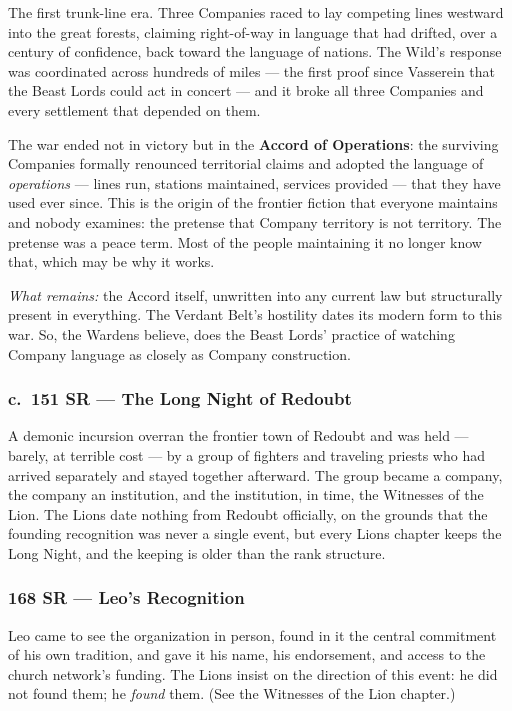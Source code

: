 The first trunk-line era. Three Companies raced to lay competing lines westward into the great forests, claiming right-of-way in language that had drifted, over a century of confidence, back toward the language of nations. The Wild's response was coordinated across hundreds of miles --- the first proof since Vasserein that the Beast Lords could act in concert --- and it broke all three Companies and every settlement that depended on them.

The war ended not in victory but in the \textbf{Accord of Operations}: the surviving Companies formally renounced territorial claims and adopted the language of \textit{operations} --- lines run, stations maintained, services provided --- that they have used ever since. This is the origin of the frontier fiction that everyone maintains and nobody examines: the pretense that Company territory is not territory. The pretense was a peace term. Most of the people maintaining it no longer know that, which may be why it works.

\textit{What remains:} the Accord itself, unwritten into any current law but structurally present in everything. The Verdant Belt's hostility dates its modern form to this war. So, the Wardens believe, does the Beast Lords' practice of watching Company language as closely as Company construction.

\subsubsection{c.~151 SR --- The Long Night of Redoubt}

A demonic incursion overran the frontier town of Redoubt and was held --- barely, at terrible cost --- by a group of fighters and traveling priests who had arrived separately and stayed together afterward. The group became a company, the company an institution, and the institution, in time, the Witnesses of the Lion. The Lions date nothing from Redoubt officially, on the grounds that the founding recognition was never a single event, but every Lions chapter keeps the Long Night, and the keeping is older than the rank structure.

\subsubsection{168 SR --- Leo's Recognition}

Leo came to see the organization in person, found in it the central commitment of his own tradition, and gave it his name, his endorsement, and access to the church network's funding. The Lions insist on the direction of this event: he did not found them; he \textit{found} them. (See the Witnesses of the Lion chapter.)

